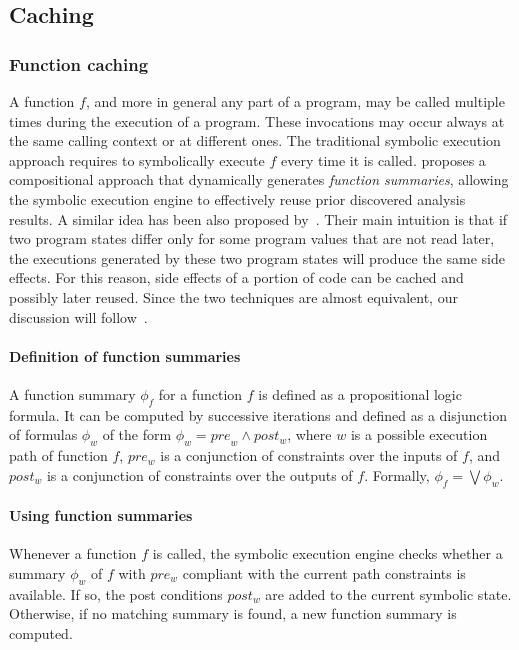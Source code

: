 \subsection{Caching} 
\label{caching}

\subsubsection{Function caching} A function $f$, and more in general any part of a program, may be called multiple times during the execution of a program. These invocations may occur always at the same calling context or at different ones. The traditional symbolic execution approach requires to symbolically execute $f$ every time it is called. \cite{G-POPL07} proposes a compositional approach that dynamically generates {\em function summaries}, allowing the symbolic execution engine to effectively reuse prior discovered analysis results. A similar idea has been also proposed by~\cite{BCE-TACAS08}. Their main intuition is that if two program states differ only for some program values that are not read later, the executions generated by these two program states will produce the same
side effects. For this reason, side effects of a portion of code can be cached and possibly later reused. Since the two techniques are almost equivalent, our discussion will follow~\cite{G-POPL07}. %

\paragraph{Definition of function summaries} A function summary $\phi_f$ for a function $f$ is defined as a propositional logic formula. It can be computed by successive iterations and defined as a disjunction of formulas $\phi_w$ of the form $\phi_w = {pre}_w \wedge post_w$, where $w$ is a possible execution path of function $f$, $pre_w$ is a conjunction of constraints over the inputs of $f$, and $post_w$ is a conjunction of constraints over the outputs of $f$. Formally, $\phi_f = \bigvee \phi_w$.  

\paragraph{Using function summaries} Whenever a function $f$ is called, the symbolic execution engine checks whether a summary $\phi_w$ of $f$ with $pre_w$ compliant with the current path constraints is available. If so, the post conditions $post_w$ are added to the current symbolic state. Otherwise, if no matching summary is found, a new function summary is computed.


